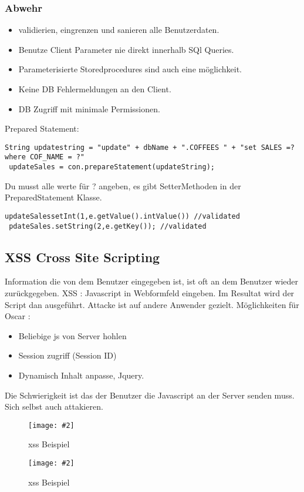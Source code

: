 \documentclass[a4paper,10pt]{scrreprt}
\newcommand{\pic}[2][figure]{\begin{figure}[h]
 \centering
 \texttt{[image: \#2]}
 \caption{#1}
\end{figure}
}
\begin{document}
\subsubsection{Abwehr}
\begin{itemize}
 \item  validierien, eingrenzen und sanieren alle Benutzerdaten.
 \item Benutze Client Parameter nie direkt innerhalb SQl Queries.
 \item Parameterisierte Storedprocedures sind auch eine möglichkeit.
 \item Keine DB Fehlermeldungen an den Client.
 \item DB Zugriff mit minimale Permissionen.
\end{itemize}

Prepared Statement:
\begin{lstlisting}[caption=Sql Injection Prepared Statement]
 String updatestring = "update" + dbName + ".COFFEES " + "set SALES =? where COF_NAME = ?"
 updateSales = con.prepareStatement(updateString);
\end{lstlisting}

Du musst alle werte für ? angeben, es gibt SetterMethoden in der PreparedStatement Klasse. 
\begin{lstlisting}[caption=sql Injection Prepared Statement Placeholder]
 updateSalessetInt(1,e.getValue().intValue()) //validated
 pdateSales.setString(2,e.getKey()); //validated
\end{lstlisting}

\subsection{XSS Cross Site Scripting}
Information die von dem Benutzer eingegeben ist, ist oft an dem Benutzer wieder zurückgegeben.
XSS : Javascript in Webformfeld eingeben. Im Resultat wird der Script dan ausgeführt. Attacke ist auf andere Anwender 
gezielt.
Möglichkeiten für Oscar :
\begin{itemize}
 \item Beliebige js von Server hohlen
 \item Session zugriff (Session ID)
 \item Dynamisch Inhalt anpasse, Jquery.
\end{itemize}

Die Schwierigkeit ist das der Benutzer die Javascript an der Server senden muss. Sich selbst auch attakieren.
\pic[xss Beispiel]{xss1.png}
\pic[xss Beispiel]{xss2.png}
\end{document}
